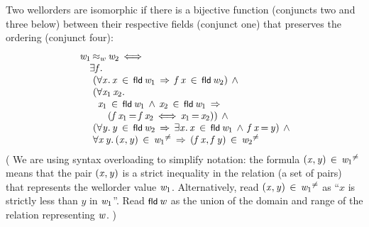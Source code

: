 \documentclass[11pt]{llncs}
\renewcommand{\HOLConst}[1]{{\textsf{\upshape\small #1}}}
\renewcommand{\HOLinline}[1]{\ensuremath{#1}}
\newenvironment{holmath}{\begin{displaymath}\begin{array}{l}}{\end{array}\end{displaymath}\ignorespacesafterend}
\begin{document}
\begin{definition} Two wellorders are isomorphic if there is a bijective function (conjuncts two and three below) between their respective fields (conjunct one) that preserves the ordering (conjunct four):
\begin{holmath}
\,\,\HOLFreeVar{w\sb{\mathrm{1}}}\,\ensuremath{{\approx_w}}\,\HOLFreeVar{w\sb{\mathrm{2}}}\,\ensuremath{{\iff}}\\
\,\,\,\,\,\,\,\,\ensuremath{{\exists}}\HOLBoundVar{f}\ensuremath{.}\\
\,\,\,\,\,\,\,\,\,\,(\ensuremath{{\forall}}\HOLBoundVar{x}\ensuremath{.}\,\HOLBoundVar{x}\,\HOLTokenIn{}\,\HOLConst{fld}\,\HOLFreeVar{w\sb{\mathrm{1}}}\,\HOLTokenImp{}\,\HOLBoundVar{f}\,\HOLBoundVar{x}\,\HOLTokenIn{}\,\HOLConst{fld}\,\HOLFreeVar{w\sb{\mathrm{2}}})\,\HOLTokenConj{}\\
\,\,\,\,\,\,\,\,\,\,(\ensuremath{{\forall}}\HOLBoundVar{x\sb{\mathrm{1}}}\,\HOLBoundVar{x\sb{\mathrm{2}}}\ensuremath{.}\\
\,\,\,\,\,\,\,\,\,\,\,\,\,\HOLBoundVar{x\sb{\mathrm{1}}}\,\HOLTokenIn{}\,\HOLConst{fld}\,\HOLFreeVar{w\sb{\mathrm{1}}}\,\HOLTokenConj{}\,\HOLBoundVar{x\sb{\mathrm{2}}}\,\HOLTokenIn{}\,\HOLConst{fld}\,\HOLFreeVar{w\sb{\mathrm{1}}}\,\HOLTokenImp{}\\
\,\,\,\,\,\,\,\,\,\,\,\,\,\,\,\,\,\,\,(\HOLBoundVar{f}\,\HOLBoundVar{x\sb{\mathrm{1}}}\,{\ensuremath{=}}\,\HOLBoundVar{f}\,\HOLBoundVar{x\sb{\mathrm{2}}}\,\ensuremath{{\iff}}\,\HOLBoundVar{x\sb{\mathrm{1}}}\,{\ensuremath{=}}\,\HOLBoundVar{x\sb{\mathrm{2}}}))\,\HOLTokenConj{}\\
\,\,\,\,\,\,\,\,\,\,(\ensuremath{{\forall}}\HOLBoundVar{y}\ensuremath{.}\,\HOLBoundVar{y}\,\HOLTokenIn{}\,\HOLConst{fld}\,\HOLFreeVar{w\sb{\mathrm{2}}}\,\HOLTokenImp{}\,\ensuremath{{\exists}}\HOLBoundVar{x}\ensuremath{.}\,\HOLBoundVar{x}\,\HOLTokenIn{}\,\HOLConst{fld}\,\HOLFreeVar{w\sb{\mathrm{1}}}\,\HOLTokenConj{}\,\HOLBoundVar{f}\,\HOLBoundVar{x}\,{\ensuremath{=}}\,\HOLBoundVar{y})\,\HOLTokenConj{}\\
\,\,\,\,\,\,\,\,\,\,\ensuremath{{\forall}}\HOLBoundVar{x}\,\HOLBoundVar{y}\ensuremath{.}\,(\HOLBoundVar{x},\HOLBoundVar{y})\,\HOLTokenIn{}\,\HOLFreeVar{w\sb{\mathrm{1}}}\ensuremath{\sp{\ne}}\,\HOLTokenImp{}\,(\HOLBoundVar{f}\,\HOLBoundVar{x},\HOLBoundVar{f}\,\HOLBoundVar{y})\,\HOLTokenIn{}\,\HOLFreeVar{w\sb{\mathrm{2}}}\ensuremath{\sp{\ne}}
\end{holmath}
(%
We are using syntax overloading to simplify notation: the formula \HOLinline{(\HOLFreeVar{x},\HOLFreeVar{y})\,\HOLTokenIn{}\,\HOLFreeVar{w\sb{\mathrm{1}}}\ensuremath{\sp{\ne}}} means that the pair \HOLinline{(\HOLFreeVar{x},\HOLFreeVar{y})} is a strict inequality in the relation (a set of pairs) that represents the wellorder value \HOLinline{\HOLFreeVar{w\sb{\mathrm{1}}}}.
Alternatively, read \HOLinline{(\HOLFreeVar{x},\HOLFreeVar{y})\,\HOLTokenIn{}\,\HOLFreeVar{w\sb{\mathrm{1}}}\ensuremath{\sp{\ne}}} as ``$x$ is strictly less than $y$ in \HOLinline{\HOLFreeVar{w\sb{\mathrm{1}}}}''.
Read \HOLinline{\HOLConst{fld}\,\HOLFreeVar{w}} as the union of the domain and range of the relation representing \HOLinline{\HOLFreeVar{w}}.%
)
\end{definition}
\end{document}
